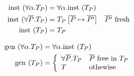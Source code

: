 \documentclass[10pt,a4paper]{article}
\begin{document}
\hfill\fbox{\pdinst{\pdTy}}

\begin{align*}
\pdinst{\tforallTy{\alpha}{\pdTy}} & = \tforallTy{\alpha}{\pdinst{\pdTy}}\\
\pdinst{\tforallPr{\listOf{P}}{\pdTy}} & = 
		\pdTy \subP{\listOf{P}}{\listOf{P'}} & \listOf{P'} \ \text{fresh} \\
\pdinst{\pdTy} & = \pdTy
\end{align*}

\hfill\fbox{\pdgen{\pdTy}}

\begin{align*}
 \text{gen}\ (\forall \alpha . {T_P})  & = \forall \alpha .  \text{inst}\ ({T_P}) \\
 \text{gen}\ ({T_P})  & = 
	\left\{
		\begin{array}{ll}
		\forall \overline{P} . {T_P} & \overline{P} \ \text{free in } {T_P} \\
		T				 & \text{othewise} 
		\end{array}
	\right. \\
\end{align*}


\hfill{}



\hfill{}
\end{document}
